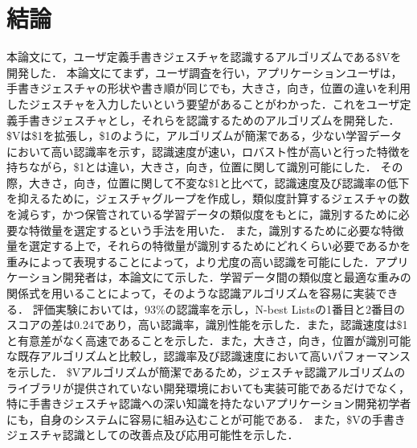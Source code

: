 \chapter{結論}
本論文にて，ユーザ定義手書きジェスチャを認識するアルゴリズムである\$Vを開発した．
本論文にてまず，ユーザ調査を行い，アプリケーションユーザは，手書きジェスチャの形状や書き順が同じでも，大きさ，向き，位置の違いを利用したジェスチャを入力したいという要望があることがわかった．これをユーザ定義手書きジェスチャとし，それらを認識するためのアルゴリズムを開発した．
\$Vは\$1を拡張し，\$1のように，アルゴリズムが簡潔である，少ない学習データにおいて高い認識率を示す，認識速度が速い，ロバスト性が高いと行った特徴を持ちながら，\$1とは違い，大きさ，向き，位置に関して識別可能にした．
その際，大きさ，向き，位置に関して不変な\$1と比べて，認識速度及び認識率の低下を抑えるために，ジェスチャグループを作成し，類似度計算するジェスチャの数を減らす，かつ保管されている学習データの類似度をもとに，識別するために必要な特徴量を選定するという手法を用いた．
また，識別するために必要な特徴量を選定する上で，それらの特徴量が識別するためにどれくらい必要であるかを重みによって表現することによって，より尤度の高い認識を可能にした．アプリケーション開発者は，本論文にて示した．学習データ間の類似度と最適な重みの関係式を用いることによって，そのような認識アルゴリズムを容易に実装できる．
評価実験においては，93\%の認識率を示し，N-best Listsの1番目と2番目のスコアの差は0.24であり，高い認識率，識別性能を示した．また，認識速度は\$1と有意差がなく高速であることを示した．また，大きさ，向き，位置が識別可能な既存アルゴリズムと比較し，認識率及び認識速度において高いパフォーマンスを示した．
\$Vアルゴリズムが簡潔であるため，ジェスチャ認識アルゴリズムのライブラリが提供されていない開発環境においても実装可能であるだけでなく，特に手書きジェスチャ認識への深い知識を持たないアプリケーション開発初学者にも，自身のシステムに容易に組み込むことが可能である．
また，\$Vの手書きジェスチャ認識としての改善点及び応用可能性を示した．